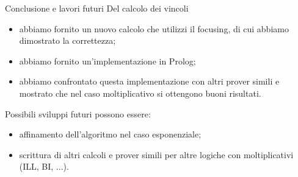 \documentclass{beamer}
\begin{document}
\begin{frame}{Conclusione e lavori futuri}
	Del calcolo dei vincoli
	\begin{itemize}
		\item abbiamo fornito un nuovo calcolo che utilizzi il focusing, di cui abbiamo dimostrato la correttezza;
		\item abbiamo fornito un'implementazione in Prolog;
		\item abbiamo confrontato questa implementazione con altri prover simili e mostrato che nel caso moltiplicativo si ottengono buoni risultati.
	\end{itemize}
  	Possibili sviluppi futuri possono essere:
	\begin{itemize}
		\item affinamento dell'algoritmo nel caso esponenziale;
		\item scrittura di altri calcoli e prover simili per altre logiche con moltiplicativi (ILL, BI, ...).
	\end{itemize}
\end{frame}

\backmatter[notitle]
\end{document}
